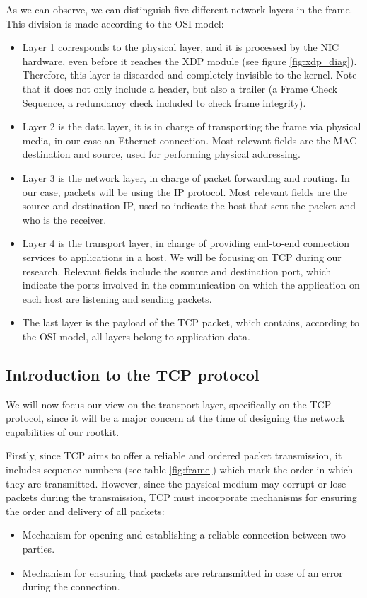 \documentclass[12pt]{report} %
\begin{document}
As we can observe, we can distinguish five different network layers in the frame. This division is made according to the OSI model\cite{network_layers}:
\begin{itemize}
\item Layer 1 corresponds to the physical layer, and it is processed by the NIC hardware, even before it reaches the XDP module (see figure \ref{fig:xdp_diag}). Therefore, this layer is discarded and completely invisible to the kernel. Note that it does not only include a header, but also a trailer (a Frame Check Sequence, a redundancy check included to check frame integrity).
\item Layer 2 is the data layer, it is in charge of transporting the frame via physical media, in our case an Ethernet connection. Most relevant fields are the MAC destination and source, used for performing physical addressing.
\item Layer 3 is the network layer, in charge of packet forwarding and routing. In our case, packets will be using the IP protocol. Most relevant fields are the source and destination IP, used to indicate the host that sent the packet and who is the receiver.
\item Layer 4 is the transport layer, in charge of providing end-to-end connection services to applications in a host. We will be focusing on TCP during our research. Relevant fields include the source and destination port, which indicate the ports involved in the communication on which the application on each host are listening and sending packets.
\item The last layer is the payload of the TCP packet, which contains, according to the OSI model, all layers belong to application data.
\end{itemize}


\subsection{Introduction to the TCP protocol} \label{subsection:tcp}
We will now focus our view on the transport layer, specifically on the TCP protocol, since it will be a major concern at the time of designing the network capabilities of our rootkit.

Firstly, since TCP aims to offer a reliable and ordered packet transmission\cite{tcp_reliable}, it includes sequence numbers (see table \ref{fig:frame}) which mark the order in which they are transmitted. However, since the physical medium may corrupt or lose packets during the transmission, TCP must incorporate mechanisms for ensuring the order and delivery of all packets:
\begin{itemize}
\item Mechanism for opening and establishing a reliable connection between two parties.
\item Mechanism for ensuring that packets are retransmitted in case of an error during the connection.
\end{itemize}
\end{document}
